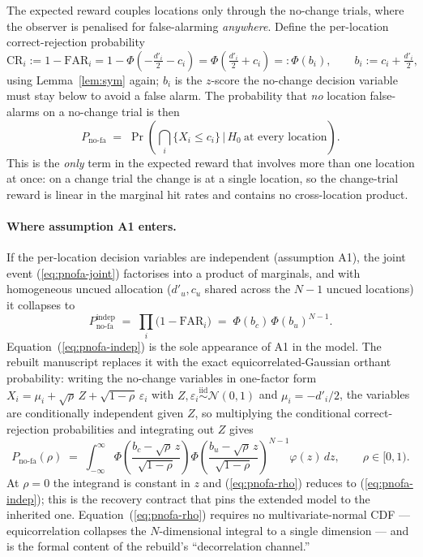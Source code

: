 \documentclass[11pt]{article}
\theoremstyle{remark}
\newcommand{\FAR}{\mathrm{FAR}}
\newcommand{\CR}{\mathrm{CR}}
\newcommand{\dprime}{d'}
\newcommand{\PnoFA}{P_{\mathrm{no\text{-}fa}}}
\newcommand{\Nloc}{N}
\begin{document}
The expected reward couples locations only through the no-change
trials, where the observer is penalised for false-alarming
\emph{anywhere}. Define the per-location correct-rejection probability
\begin{equation}
  \CR_i := 1 - \FAR_i
  = 1 - \Phi\!\left(-\tfrac{\dprime_i}{2} - c_i\right)
  = \Phi\!\left(\tfrac{\dprime_i}{2} + c_i\right)
  =: \Phi(b_i),
  \qquad
  b_i := c_i + \tfrac{\dprime_i}{2},
  \label{eq:cr}
\end{equation}
using Lemma~\ref{lem:sym} again; $b_i$ is the $z$-score the no-change
decision variable must stay below to avoid a false alarm. The
probability that \emph{no} location false-alarms on a no-change trial
is then
\begin{equation}
  \PnoFA
  \;=\;
  \Pr\!\left(\bigcap_{i} \{X_i \le c_i\} \,\Big|\, H_0\ \text{at every location}\right).
  \label{eq:pnofa-joint}
\end{equation}
This is the \emph{only} term in the expected reward that involves more
than one location at once: on a change trial the change is at a single
location, so the change-trial reward is linear in the marginal hit
rates and contains no cross-location product.

\paragraph{Where assumption A1 enters.}
If the per-location decision variables are independent (assumption
A1), the joint event (\ref{eq:pnofa-joint}) factorises into a product
of marginals, and with homogeneous uncued allocation
($\dprime_u, c_u$ shared across the $\Nloc-1$ uncued locations) it
collapses to
\begin{equation}
  \PnoFA^{\text{indep}}
  \;=\;
  \prod_{i}\big(1 - \FAR_i\big)
  \;=\;
  \Phi(b_c)\,\Phi(b_u)^{\Nloc - 1}.
  \label{eq:pnofa-indep}
\end{equation}
Equation~(\ref{eq:pnofa-indep}) is the sole appearance of A1 in the
model. The rebuilt manuscript replaces it with the exact
equicorrelated-Gaussian orthant probability: writing the no-change
variables in one-factor form
$X_i = \mu_i + \sqrt{\rho}\,Z + \sqrt{1-\rho}\,\varepsilon_i$ with
$Z, \varepsilon_i \stackrel{\text{iid}}{\sim} \mathcal{N}(0,1)$ and
$\mu_i = -\dprime_i/2$, the variables are conditionally independent
given $Z$, so multiplying the conditional correct-rejection
probabilities and integrating out $Z$ gives
\begin{equation}
  \PnoFA(\rho)
  \;=\;
  \int_{-\infty}^{\infty}
  \Phi\!\left(\frac{b_c - \sqrt{\rho}\,z}{\sqrt{1-\rho}}\right)
  \Phi\!\left(\frac{b_u - \sqrt{\rho}\,z}{\sqrt{1-\rho}}\right)^{\!\Nloc - 1}
  \varphi(z)\,dz,
  \qquad \rho \in [0,1).
  \label{eq:pnofa-rho}
\end{equation}
At $\rho = 0$ the integrand is constant in $z$ and
(\ref{eq:pnofa-rho}) reduces to (\ref{eq:pnofa-indep}); this is the
recovery contract that pins the extended model to the inherited one.
Equation~(\ref{eq:pnofa-rho}) requires no multivariate-normal CDF ---
equicorrelation collapses the $\Nloc$-dimensional integral to a single
dimension --- and is the formal content of the rebuild's
``decorrelation channel.''
\end{document}
